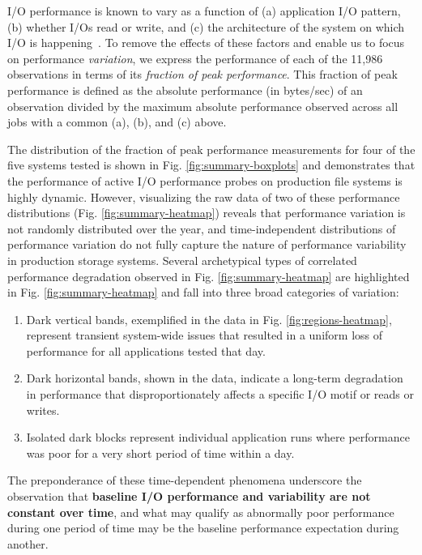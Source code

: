 I/O performance is known to vary as a function of (a) application I/O pattern, (b) whether I/Os read or write, and (c) the architecture of the system on which I/O is happening~\cite{Lockwood2017, Xie2012}.
To remove the effects of these factors and enable us to focus on performance \emph{variation}, we express the performance of each of the 11,986 observations in terms of its \emph{fraction of peak performance}.
This fraction of peak performance is defined as the absolute performance (in bytes/sec) of an observation divided by the maximum absolute performance observed across all jobs with a common (a), (b), and (c) above.

The distribution of the fraction of peak performance measurements for four of the five systems tested is shown in Fig. \ref{fig:summary-boxplots} and demonstrates that the performance of active I/O performance probes on production file systems is highly dynamic.
However, visualizing the raw data of two of these performance distributions (Fig. \ref{fig:summary-heatmap}) reveals that performance variation is not randomly distributed over the year, and time-independent distributions of performance variation do not fully capture the nature of performance variability in production storage systems.
Several archetypical types of correlated performance degradation observed in Fig. \ref{fig:summary-heatmap} are highlighted in Fig. \ref{fig:summary-heatmap} and fall into three broad categories of variation:

\begin{enumerate}[leftmargin=*]
\item Dark vertical bands, exemplified in the \mira data in Fig. \ref{fig:regions-heatmap}, represent transient system-wide issues that resulted in a uniform loss of performance for all applications tested that day.
\item Dark horizontal bands, shown in the \cori data, indicate a long-term degradation in performance that disproportionately affects a specific I/O motif or reads or writes.
\item Isolated dark blocks represent individual application runs where performance was poor for a very short period of time within a day.
\end{enumerate}

The preponderance of these time-dependent phenomena underscore the observation that \textbf{baseline I/O performance and variability are not constant over time}, and
what may qualify as abnormally poor performance during one period of time may be the baseline performance expectation during another.

